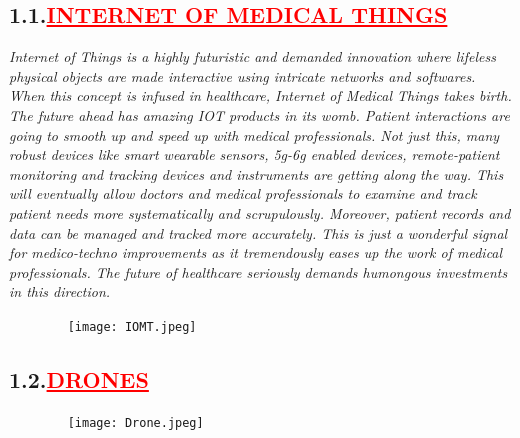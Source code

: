 \documentclass[12pt]{article}
\begin{document}
\subsection*{\textbf{\hspace{1cm}1.1.\hspace{1cm}\textcolor{red}{\underline{\Large{INTERNET OF MEDICAL THINGS}}}}}
\hspace{1cm}\large{\emph{Internet of Things is a highly futuristic and demanded innovation where lifeless physical objects are made interactive using intricate networks and softwares. When this concept is infused in healthcare, Internet of Medical Things takes birth. The future ahead has amazing IOT products in its womb. Patient interactions are going to smooth up and speed up with medical professionals. Not just this, many robust devices like smart wearable sensors, 5g-6g enabled devices, remote-patient monitoring and tracking devices and instruments are getting along the way. This will eventually allow doctors and medical professionals to examine and track patient needs more systematically and scrupulously. Moreover, patient records and data can be managed and tracked more accurately. This is just a wonderful signal for medico-techno improvements as it tremendously eases up the work of medical professionals. The future of healthcare seriously demands humongous investments in this direction.}} 
\begin{figure}
    \centering
    \texttt{[image: IOMT.jpeg]}
\end{figure}

\subsection*{\textbf{\hspace{1cm}1.2.\hspace{1cm}\textcolor{red}{\underline{\Large{DRONES}}}}}

\begin{figure}
    \centering
    \texttt{[image: Drone.jpeg]}
\end{figure}
\end{document}
